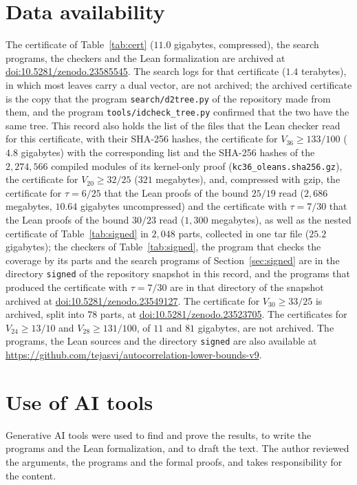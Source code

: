 \documentclass[11pt]{amsart}
\theoremstyle{definition}
\theoremstyle{remark}
\numberwithin{equation}{section}
\newcommand{\SuppDOI}{10.5281/zenodo.23585545}
\newcommand{\RepoLink}{\url{https://github.com/tejasvi/autocorrelation-lower-bounds-v9}}
\newcommand{\QTabGB}{25.2}
\newcommand{\LeanSigSlash}{25/19}
\newcommand{\TabMB}{2{,}686}
\newcommand{\TabGBun}{10.64}
\begin{document}
\section*{Data availability}
The certificate of Table~\ref{tab:cert} ($11.0$ gigabytes, compressed), the search programs, the checkers and the Lean formalization are archived at \href{https://doi.org/\SuppDOI}{doi:\SuppDOI}. The search logs for that certificate ($1.4$ terabytes), in which most leaves carry a dual vector, are not archived; the archived certificate is the copy that the program \texttt{search/d2tree.py} of the repository made from them, and the program \texttt{tools/idcheck\_tree.py} confirmed that the two have the same tree. This record also holds the list of the files that the Lean checker read for this certificate, with their SHA-256 hashes, the certificate for $V_{36}\ge133/100$ ($4.8$ gigabytes) with the corresponding list and the SHA-256 hashes of the $2{,}274{,}566$ compiled modules of its kernel-only proof (\texttt{kc36\_oleans.sha256.gz}), the certificate for $V_{20}\ge32/25$ ($321$ megabytes), and, compressed with gzip, the certificate for $\tau=6/25$ that the Lean proofs of the bound $\LeanSigSlash$ read ($\TabMB$ megabytes, $\TabGBun$ gigabytes uncompressed) and the certificate with $\tau=7/30$ that the Lean proofs of the bound $30/23$ read ($1{,}300$ megabytes), as well as the nested certificate of Table~\ref{tab:signed} in $2{,}048$ parts, collected in one tar file ($\QTabGB$ gigabytes); the checkers of Table~\ref{tab:signed}, the program that checks the coverage by its parts and the search programs of Section~\ref{sec:signed} are in the directory \texttt{signed} of the repository snapshot in this record, and the programs that produced the certificate with $\tau=7/30$ are in that directory of the snapshot archived at \href{https://doi.org/10.5281/zenodo.23549127}{doi:10.5281/zenodo.23549127}. The certificate for $V_{30}\ge33/25$ is archived, split into $78$ parts, at \href{https://doi.org/10.5281/zenodo.23523705}{doi:10.5281/zenodo.23523705}. The certificates for $V_{24}\ge13/10$ and $V_{28}\ge131/100$, of $11$ and $81$ gigabytes, are not archived. The programs, the Lean sources and the directory \texttt{signed} are also available at \RepoLink.

\section*{Use of AI tools}
Generative AI tools were used to find and prove the results, to write the programs and the Lean formalization, and to draft the text. The author reviewed the arguments, the programs and the formal proofs, and takes responsibility for the content.
\end{document}
